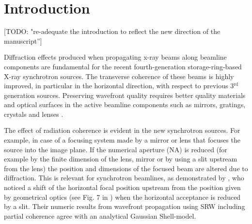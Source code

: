 \documentclass{iucr}              %
\newcommand{\todo}[1]{{\color{red}[TODO: "#1'']}}
\begin{document}

\section{Introduction}
\label{sec:introduction}

\todo{re-adequate the introduction to reflect the new direction of the manuscript} 

Diffraction effects produced when propagating x-ray beams along beamline components are fundamental for the 
recent fourth-generation storage-ring-based X-ray synchrotron sources. The transverse coherence of these beams is highly improved, in particular in the horizontal direction, with respect to previous 3$^{\text{rd}}$ generation sources.
Preserving wavefront quality requires better quality materials and optical surfaces in the active beamline components such as mirrors, gratings, crystals and lenses \cite{Yabashi, Roth2017}.

The effect of radiation coherence is evident in the new synchrotron sources. For example, in case of a focusing system made by a mirror or lens that focuses the source into the image plane. If the numerical aperture (NA) is reduced (for example by the finite dimension of the lens, mirror or by using a slit upstream from the lens) the position and dimensions of the focused beam are altered due to diffraction. This is relevant for synchrotron beamlines, as demonstrated by , who noticed a shift of the horizontal focal position upstream from the position given by geometrical optics (see Fig. 7 in ) when the horizontal acceptance is reduced by a slit. Their numeric results from wavefront propagation using SRW \cite{codeSRW} including partial coherence agree with an analytical Gaussian Shell-model.
\end{document}
